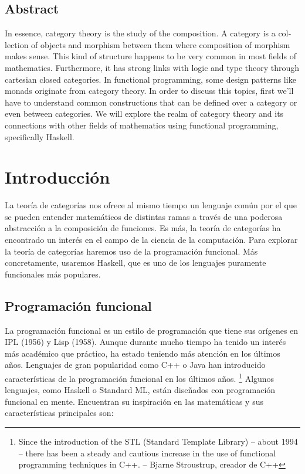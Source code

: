 \documentclass[12pt, twoside]{book}
\begin{document}
\section*{Abstract}
\begin{otherlanguage}{english}
    In essence, category theory is the study of the composition.
    A category is a collection of objects and morphism between them where composition of morphism makes sense.
    This kind of structure happens to be very common in most fields of mathematics.
    Furthermore, it has strong links with logic and type theory through cartesian closed categories.
    In functional programming, some design patterns like monads originate from category theory.
    In order to discuss this topics, first we'll have to understand common constructions that can be defined over a category or even between categories. 
    We will explore the realm of category theory and its connections with other fields of mathematics using functional programming, specifically Haskell.
\end{otherlanguage}

\chapter{Introducción}
La teoría de categorías nos ofrece al mismo tiempo un lenguaje común por el que se pueden entender matemáticos de distintas ramas a través de una poderosa abstracción a la composición de funciones.
Es más, la teoría de categorías ha encontrado un interés en el campo de la ciencia de la computación.
Para explorar la teoría de categorías haremos uso de la programación funcional.
Más concretamente, usaremos Haskell, que es uno de los lenguajes puramente funcionales más populares.

\section{Programación funcional}
La programación funcional es un estilo de programación que tiene sus orígenes en IPL (1956) y Lisp (1958).
Aunque durante mucho tiempo ha tenido un interés más académico que práctico, ha estado teniendo más atención en los últimos años.
Lenguajes de gran popularidad como C++ o Java han introducido características de la programación funcional en los últimos años.
\footnote{Since the introduction of the STL (Standard Template Library) -- about 1994 -- there has been a steady and cautious increase in the use of functional programming techniques in C++. -- Bjarne Stroustrup, creador de C++}
Algunos lenguajes, como Haskell o Standard ML, están diseñados con programación funcional en mente.
Encuentran su inspiración en las matemáticas y sus características principales son:
\end{document}

